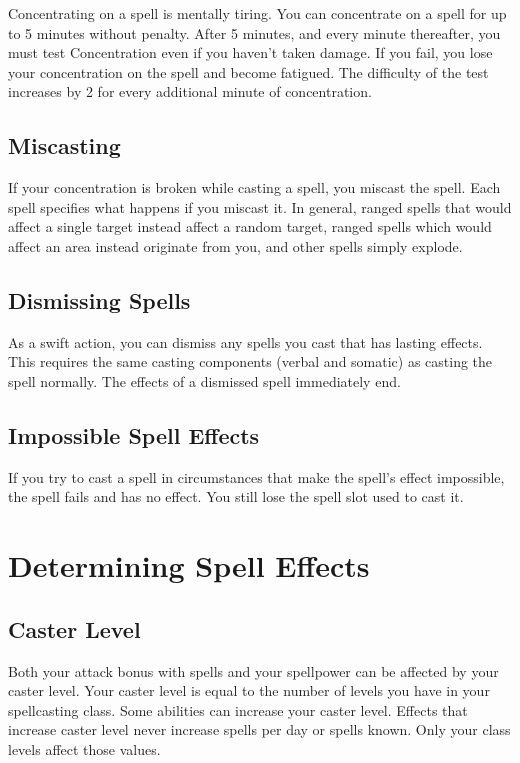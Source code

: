  Concentrating on a spell is mentally tiring. You can concentrate on a spell for up to 5 minutes without penalty. After 5 minutes, and every minute thereafter, you must test Concentration even if you haven't taken damage. If you fail, you lose your concentration on the spell and become fatigued. The difficulty of the test increases by 2 for every additional minute of concentration.

\subsection{Miscasting}\label{Miscasting}

If your concentration is broken while casting a spell, you miscast the spell. Each spell specifies what happens if you miscast it. In general, ranged spells that would affect a single target instead affect a random target, ranged spells which would affect an area instead originate from you, and other spells simply explode.
\subsection{Dismissing Spells}

As a swift action, you can dismiss any spells you cast that has lasting effects. This requires the same casting components (verbal and somatic) as casting the spell normally. The effects of a dismissed spell immediately end.

\subsection{Impossible Spell Effects}
If you try to cast a spell in circumstances that make the spell's effect impossible, the spell fails and has no effect. You still lose the spell slot used to cast it.

\section{Determining Spell Effects}

\subsection{Caster Level}

Both your attack bonus with spells and your spellpower can be affected by your caster level. Your caster level is equal to the number of levels you have in your spellcasting class. Some abilities can increase your caster level. Effects that increase caster level never increase spells per day or spells known. Only your class levels affect those values.

